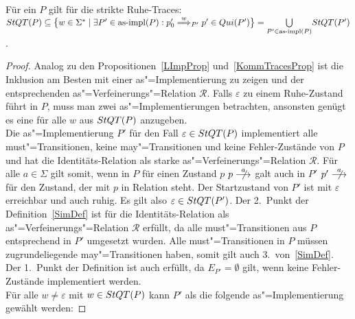 \vspace{0.2cm}

\begin{Prop}
  \label{RuheTraceProp}
  Für ein \MEIO{} $P$ gilt für die strikte Ruhe-Traces: $\StQT (P) \subseteq
  \big\{w\in\Sigma ^*\mid \exists P'\in\asimp (P): p'_0 \weakmust[w]_{P'}
  p'\in Qui(P')\big\} = \underset{P'\in\asimp (P)}{\bigcup} \StQT (P')$.
\end{Prop}
\begin{proof}
  Analog zu den Propositionen~\ref{LImpProp} und~\ref{KommTracesProp} ist die
  Inklusion am Besten mit einer as"=Implementierung zu zeigen und der
  entsprechenden as"=Verfeinerungs"=Relation $\mathcal{R}$. Falls $\varepsilon$
  zu einem Ruhe-Zustand führt in $P$, muss man zwei as"=Implementierungen
  betrachten, ansonsten genügt es eine für alle $w$ aus $StQT (P)$
  anzugeben.\\
  Die as"=Implementierung $P'$ für den Fall $\varepsilon\in StQT (P)$
  implementiert alle must"=Transitionen, keine may"=Transitionen und keine
  Fehler-Zustände von $P$ und hat die Identitäts-Relation als starke
  as"=Verfeinerungs"=Relation $\mathcal{R}$. Für alle $a\in\Sigma$ gilt somit,
  wenn in $P$ für einen Zustand $p$ $p\nmust[a]$ galt auch in $P'$ $p'
  \nmust[a]$ für den Zustand, der mit $p$ in Relation steht. Der Startzustand
  von $P'$ ist mit $\varepsilon$ erreichbar und auch ruhig. Es gilt also
  $\varepsilon\in StQT (P')$. Der 2.\ Punkt der Definition~\ref{SimDef} ist für
  die Identitäts-Relation als as"=Verfeinerungs"=Relation $\mathcal{R}$
  erfüllt, da alle must"=Transitionen aus $P$ entsprechend in $P'$ umgesetzt
  wurden. Alle must"=Transitionen in $P$ müssen zugrundeliegende
  may"=Transitionen haben, somit gilt auch 3.\ von~\ref{SimDef}. Der 1.\ Punkt
  der Definition ist auch erfüllt, da $E_{P'}=\emptyset$ gilt, wenn keine
  Fehler-Zustände implementiert werden.\\
  Für alle $w\neq \varepsilon$ mit $w\in StQT (P)$ kann $P'$ als die folgende
  as"=Implementierung gewählt werden:
\end{proof}
